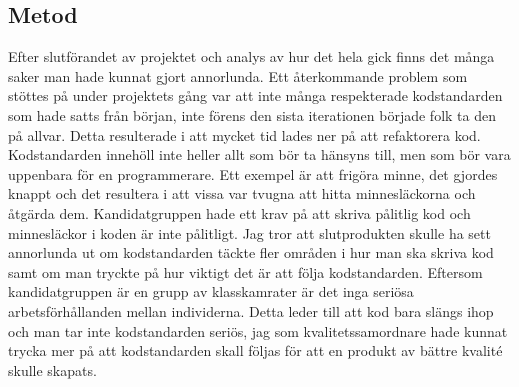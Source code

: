 \subsection{Metod}
Efter slutförandet av projektet och analys av hur det hela gick finns det många saker man hade kunnat gjort annorlunda. Ett återkommande problem som stöttes på under projektets gång var att inte många respekterade kodstandarden som hade satts från början, inte förens den sista iterationen började folk ta den på allvar. Detta resulterade i att mycket tid lades ner på att refaktorera kod. Kodstandarden innehöll inte heller allt som bör ta hänsyns till, men som bör vara uppenbara för en programmerare. Ett exempel är att frigöra minne, det gjordes knappt och det resultera i att vissa var tvugna att hitta minnesläckorna och åtgärda dem. Kandidatgruppen hade ett krav på att skriva pålitlig kod och minnesläckor i koden är inte pålitligt.
\newline
\newline
Jag tror att slutprodukten skulle ha sett annorlunda ut om kodstandarden täckte fler områden i hur man ska skriva kod samt om man tryckte på hur viktigt det är att följa kodstandarden. Eftersom kandidatgruppen är en grupp av klasskamrater är det inga seriösa arbetsförhållanden mellan individerna. Detta leder till att kod bara slängs ihop och man tar inte kodstandarden seriös, jag som kvalitetssamordnare hade kunnat trycka mer på att kodstandarden skall följas för att en produkt av bättre kvalité skulle skapats.
